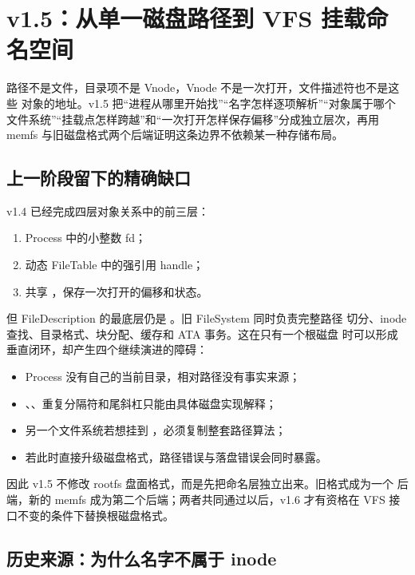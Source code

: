 \section{v1.5：从单一磁盘路径到 VFS 挂载命名空间}

\begin{keyidea}
路径不是文件，目录项不是 Vnode，Vnode 不是一次打开，文件描述符也不是这些
对象的地址。v1.5 把“进程从哪里开始找”“名字怎样逐项解析”“对象属于哪个
文件系统”“挂载点怎样跨越”和“一次打开怎样保存偏移”分成独立层次，再用
memfs 与旧磁盘格式两个后端证明这条边界不依赖某一种存储布局。
\end{keyidea}

\subsection{上一阶段留下的精确缺口}

v1.4 已经完成四层对象关系中的前三层：

\begin{enumerate}
  \item Process 中的小整数 fd；
  \item 动态 FileTable 中的强引用 handle；
  \item 共享 ，保存一次打开的偏移和状态。
\end{enumerate}

但 FileDescription 的最底层仍是
。旧 FileSystem 同时负责完整路径
切分、inode 查找、目录格式、块分配、缓存和 ATA 事务。这在只有一个根磁盘
时可以形成垂直闭环，却产生四个继续演进的障碍：

\begin{itemize}
  \item Process 没有自己的当前目录，相对路径没有事实来源；
  \item {}、、重复分隔符和尾斜杠只能由具体磁盘实现解释；
  \item 另一个文件系统若想挂到 ，必须复制整套路径算法；
  \item 若此时直接升级磁盘格式，路径错误与落盘错误会同时暴露。
\end{itemize}

因此 v1.5 不修改 rootfs 盘面格式，而是先把命名层独立出来。旧格式成为一个
后端，新的 memfs 成为第二个后端；两者共同通过以后，v1.6 才有资格在 VFS
接口不变的条件下替换根磁盘格式。

\subsection{历史来源：为什么名字不属于 inode}

